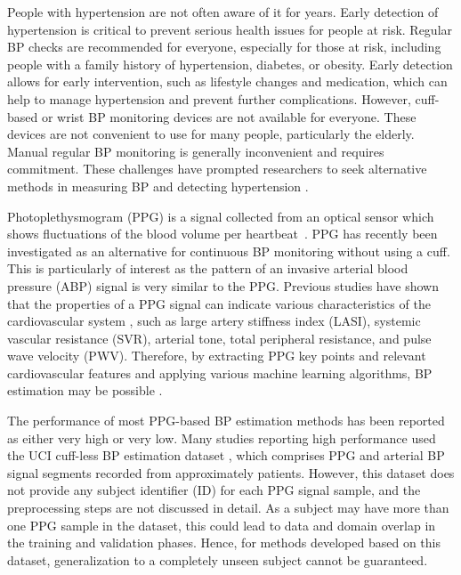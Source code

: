 \documentclass[letterpaper, 10 pt, conference]{ieeeconf}
\begin{document}
People with hypertension are not often aware of it for years. Early detection of hypertension is critical to prevent serious health issues for people at risk. Regular BP checks are recommended for everyone, especially for those at risk, including people with a family history of hypertension, diabetes, or obesity. Early detection allows for early intervention, such as lifestyle changes and medication, which can help to manage hypertension and prevent further complications. However, cuff-based or wrist BP monitoring devices are not available for everyone. These devices are not convenient to use for many people, particularly the elderly. Manual regular BP monitoring is generally inconvenient and requires commitment. These challenges have prompted researchers to seek alternative methods in measuring BP and detecting hypertension \cite{zhao2023emerging}.

Photoplethysmogram (PPG) is a signal collected from an optical sensor which shows fluctuations of the blood volume per heartbeat~\cite{hasanzadeh2023multi}. PPG has recently been investigated as an alternative for continuous BP monitoring without using a cuff. This is particularly of interest as the pattern of an invasive arterial blood pressure (ABP) signal is very similar to the PPG. 
Previous studies have shown that the properties of a PPG signal can indicate various characteristics of the cardiovascular system  \cite{padilla2006assessment, wang2009noninvasive}, such as large artery stiffness index (LASI), systemic vascular resistance (SVR), arterial tone, total peripheral resistance, and pulse wave velocity (PWV). Therefore, by extracting PPG key points and relevant cardiovascular features and applying various machine learning algorithms, BP estimation may be possible \cite{kachuee2016cuffless, aguet2023blood}.

The performance of most PPG-based BP estimation methods has been reported as either very high or very low. Many studies reporting high performance used the UCI cuff-less BP estimation dataset \cite{kachuee2016cuffless}, which comprises  PPG and arterial BP signal segments recorded from approximately  patients. However, this dataset does not provide any subject identifier (ID) for each PPG signal sample, and the preprocessing steps are not discussed in detail. As a subject may have more than one PPG sample in the dataset, this could lead to data and domain overlap in the training and validation phases. Hence, for methods developed based on this dataset, generalization to a completely unseen subject cannot be guaranteed.
\end{document}
